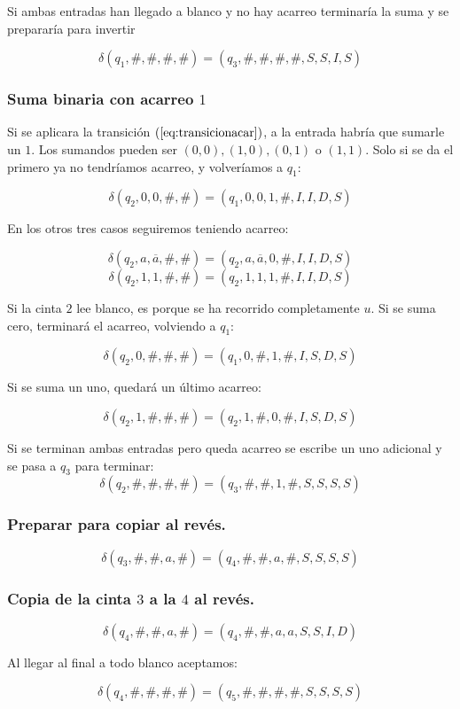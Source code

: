\documentclass[12pt]{article}
\begin{document}
\begin{ejercicio}
        Si ambas entradas han llegado a blanco y no hay acarreo terminaría
        la suma y se prepararía para invertir

        $$\delta(q_1, \#, \#, \#, \#) = (q_3, \#, \#, \#, \#, S, S, I, S)$$

        \newpage

        \subsubsection*{Suma binaria con acarreo $1$}

        Si se aplicara la transición $(\ref{eq:transicionacar})$, 
        a la entrada habría que sumarle un $1$. Los sumandos pueden ser 
        $(0,0), (1,0), (0,1)$ o $(1,1)$. Solo si se da el primero ya no tendríamos 
        acarreo, y volveríamos a $q_1$:

        $$\delta(q_2, 0, 0, \#, \#) = (q_1, 0, 0, 1, \#, I, I, D, S)$$
        
        En los otros tres casos seguiremos teniendo acarreo:
        
        $$\delta(q_2, a, \overline{a}, \#, \#) = (q_2, a, \overline{a}, 0, \#, I, I, D, S)$$
        $$\delta(q_2, 1, 1, \#, \#) = (q_2, 1, 1, 1, \#, I, I, D, S)$$

        Si la cinta $2$ lee blanco, es porque se ha recorrido completamente $u$.
        Si se suma cero, terminará el acarreo, volviendo a $q_1$:

        $$\delta(q_2, 0, \#, \#, \#) = (q_1, 0, \#, 1, \#, I, S, D, S)$$

        Si se suma un uno, quedará un último acarreo:

        $$\delta(q_2, 1, \#, \#, \#) = (q_2, 1, \#, 0, \#, I, S, D, S)$$

        Si se terminan ambas entradas pero queda acarreo se escribe
        un uno adicional y se pasa a $q_3$ para terminar:
        $$\delta(q_2, \#, \#, \#, \#) = (q_3, \#, \#, 1, \#, S, S, S, S)$$

        \subsubsection*{Preparar para copiar al revés.}

        $$\delta(q_3, \#, \#, a, \#) = (q_4, \#, \#, a, \#, S, S, S, S)$$

        \subsubsection*{Copia de la cinta $3$ a la $4$ al revés.}

        $$\delta(q_4, \#, \#, a, \#) = (q_4, \#, \#, a, a, S, S, I, D)$$

        Al llegar al final a todo blanco aceptamos:

        $$\delta(q_4, \#, \#, \#, \#) = (q_5, \#, \#, \#, \#, S, S, S, S)$$
    \end{ejercicio}
\end{document}
